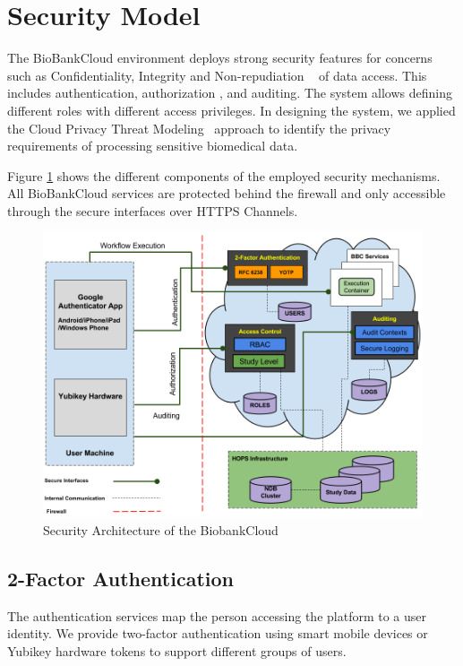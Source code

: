 \section{Security Model}

The BioBankCloud environment deploys strong security features for concerns such as Confidentiality, Integrity and Non-repudiation ~\cite{BBCSEC} of data access. This includes authentication, authorization
, and auditing. The system allows defining different roles with different access privileges. In designing the system, we applied the Cloud Privacy Threat Modeling~\cite {CPTM} approach to identify the privacy requirements of processing sensitive biomedical data.



Figure \ref{fig:security} shows the different components of the employed security mechanisms. All BioBankCloud services are protected behind the firewall and only accessible through the secure interfaces over HTTPS Channels.


\begin{figure}[h]
\centering
\includegraphics[width=\textwidth]{./imgs/security.png}
\caption{Security Architecture of the BiobankCloud}
\label{fig:security}
\end{figure}


\subsection{2-Factor Authentication}
 The authentication services map the person accessing the platform to a user identity. We provide two-factor authentication using smart mobile devices or Yubikey hardware tokens to support different groups of users.

